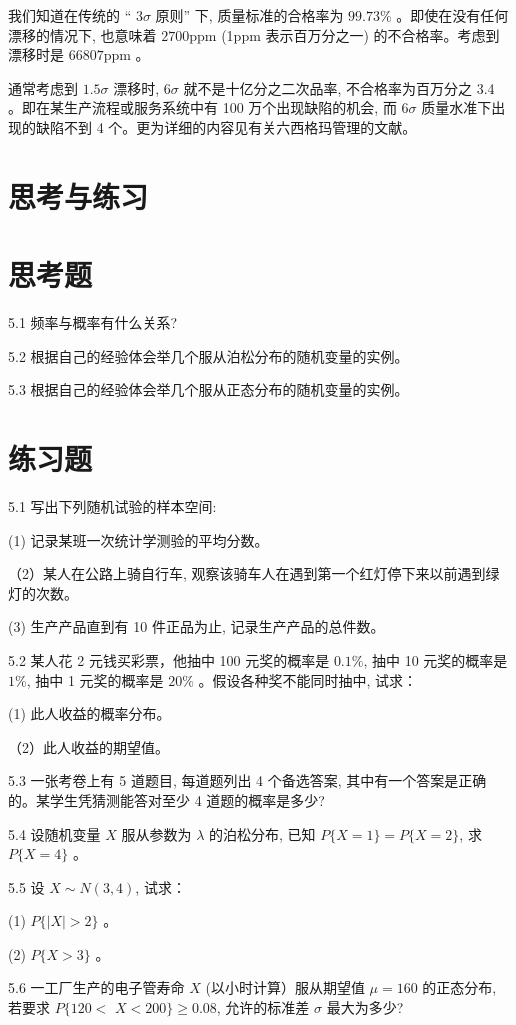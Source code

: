 \documentclass[10pt]{article}
\begin{document}
\begin{CJK*}{UTF8}{bsmi}
我们知道在传统的 “ $3 \sigma$ 原则” 下, 质量标准的合格率为 $99.73 \%$ 。即使在没有任何漂移的情况下, 也意味着 $2700 \mathrm{ppm}$ (1ppm 表示百万分之一) 的不合格率。考虑到漂移时是 $66807 \mathrm{ppm}$ 。

通常考虑到 $1.5 \sigma$ 漂移时, $6 \sigma$ 就不是十亿分之二次品率, 不合格率为百万分之 3.4 。即在某生产流程或服务系统中有 100 万个出现缺陷的机会, 而 $6 \sigma$ 质量水准下出现的缺陷不到 4 个。更为详细的内容见有关六西格玛管理的文献。

\section*{思考与练习}
\section*{思考题}
5.1 频率与概率有什么关系?

5.2 根据自己的经验体会举几个服从泊松分布的随机变量的实例。

5.3 根据自己的经验体会举几个服从正态分布的随机变量的实例。

\section*{练习题}
5.1 写出下列随机试验的样本空间:

(1) 记录某班一次统计学测验的平均分数。

（2）某人在公路上骑自行车, 观察该骑车人在遇到第一个红灯停下来以前遇到绿灯的次数。

(3) 生产产品直到有 10 件正品为止, 记录生产产品的总件数。

5.2 某人花 2 元钱买彩票，他抽中 100 元奖的概率是 $0.1 \%$, 抽中 10 元奖的概率是 $1 \%$, 抽中 1 元奖的概率是 $20 \%$ 。假设各种奖不能同时抽中, 试求：

(1) 此人收益的概率分布。

（2）此人收益的期望值。

5.3 一张考卷上有 5 道题目, 每道题列出 4 个备选答案, 其中有一个答案是正确的。某学生凭猜测能答对至少 4 道题的概率是多少?

5.4 设随机变量 $X$ 服从参数为 $\lambda$ 的泊松分布, 已知 $P\{X=1\}=P\{X=2\}$, 求 $P\{X=4\}$ 。

5.5 设 $X \sim N(3,4)$, 试求：

(1) $P\{|X|>2\}$ 。

(2) $P\{X>3\}$ 。

5.6 一工厂生产的电子管寿命 $X$ (以小时计算）服从期望值 $\mu=160$ 的正态分布, 若要求 $P\{120<$ $X<200\} \geqslant 0.08$, 允许的标准差 $\sigma$ 最大为多少?


\end{CJK*}
\end{document}
